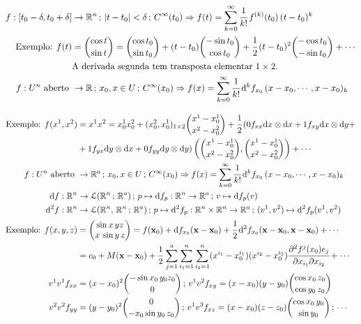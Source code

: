 \documentclass[12pt]{article}
\begin{document}
\begin{align}
  f : [t_0 - \delta, t_0 + \delta] &\rightarrow \mathbb{R}^n\,;\,\vert t - t_0\vert < \delta\,;\,C^\infty(t_0) \Rightarrow f(t) = \sum_{k = 0}^{\infty} \cfrac{1}{k!}\, f^{(k)} (t_0)\,(t - t_0)^k \\
  \text{Exemplo: } f(t) &= \binom{\cos t}{\sin t} = \binom{\cos t_0}{\sin t_0} + (t - t_0) \binom{- \sin t_0}{\cos t_0} + \cfrac{1}{2}\,(t - t_0)^2 \binom{- \cos t_0}{- \sin t_0} + \cdots \\
  &\text{A derivada segunda tem transposta elementar }1 \times 2. \\
  f : U^n\text{ aberto } &\rightarrow \mathbb{R}\,;\,x_0, x \in U\,;\,C^\infty(x_0) \Rightarrow f(x) = \sum_{k = 0}^{\infty} \cfrac{1}{k!}\, \mathrm{d}^{k} f_{x_0}\,(x - x_0, \cdots, x - x_0)_{k}
\end{align}

\begin{align}
  \text{Exemplo: } f(x^1,x^2) &= x^1 x^2 = x_0^1 x_0^2 + (x_0^2, x_0^1)_{1 \times 2} \binom{x^1 - x_0^1}{x^2 - x_0^2} + \cfrac{1}{2}\,(0 f_{xx} \mathrm{d}x \otimes \mathrm{d}x + 1 f_{xy} \mathrm{d}x \otimes \mathrm{d}y + \\
  &+ 1 f_{yx} \mathrm{d}y \otimes \mathrm{d}x + 0 f_{yy} \mathrm{d}y \otimes \mathrm{d}y)\left(\binom{x^1 - x_0^1}{x^2 - x_0^2}, \binom{x^1 - x_0^1}{x^2 - x_0^2}\right) + \cdots \\
  f: U^n\text{ aberto } &\rightarrow \mathbb{R}^a \,;\,x_0, x \in U\,;\,C^\infty(x_0) \Rightarrow f(x) = \sum_{k = 0}^{\infty} \cfrac{1}{k!}\, \mathrm{d}^{k} f_{x_0}\,(x - x_0, \cdots, x - x_0)_{k} \\
  \mathrm{d}f : \mathbb{R}^n &\rightarrow \mathcal{L}(\mathbb{R}^n\,;\,\mathbb{R}^a)\,;\,p \mapsto \mathrm{d}f_p : \mathbb{R}^n \rightarrow \mathbb{R}^a\,;\,v \mapsto \mathrm{d}f_p(v) \\
  \mathrm{d}^2f : \mathbb{R}^n &\rightarrow \mathcal{L}(\mathbb{R}^n,\,\mathbb{R}^n\,;\,\mathbb{R}^a)\,;\,p \mapsto \mathrm{d}^2 f_p : \mathbb{R}^n \times \mathbb{R}^n \rightarrow \mathbb{R}^a\,;\,(v^1, v^2) \mapsto \mathrm{d}^2f_p(v^1, v^2) \\
  \text{Exemplo: }f(x,y,z) &= \left( \begin{matrix} \sin x\,yz \\ x\,\sin y\,z \end{matrix} \right) = f(\mathbf{x}_0) + \mathrm{d}f_{x_0}(\mathbf{x} - \mathbf{x}_0) + \cfrac{1}{2}\, \mathrm{d}^2 f_{x_0}(\mathbf{x} - \mathbf{x}_0, \mathbf{x} - \mathbf{x}_0) + \cdots \\
  &= c_0 + M (\mathbf{x} - \mathbf{x}_0) + \cfrac{1}{2}\, \sum_{j = 1}^a \sum_{i_1 = 1}^n \sum_{i_2 = 1}^n (x^{i_1} - x_0^{i_1}) (x^{i_2} - x_0^{i_2}) \cfrac{\partial^2 f^j(x_0) e_j}{\partial x_{i_1} \partial x_{i_2}} + \cdots \\
  v^1 v^1 f_{xx} &= (x - x_0)^2 \binom{-\sin x_0\,y_0z_0}{0}\,;\,v^1 v^2 f_{xy} = (x - x_0)(y - y_0) \binom{\cos x_0\,z_0}{\cos y_0\,z_0} \\
  v^2 v^2 f_{yy} &= (y - y_0)^2 \binom{0}{-x_0 \sin y_0\,z_0}\,;\,v^1 v^3 f_{xz} = (x - x_0)(z - z_0) \binom{\cos x_0\,y_0}{\sin y_0}\,;\,\cdots
\end{align}
\end{document}

